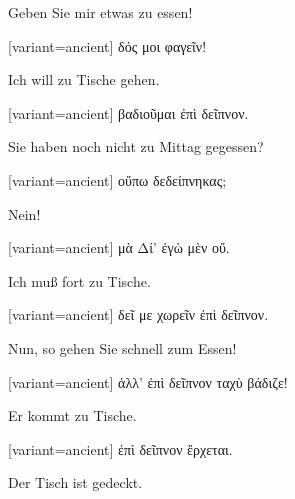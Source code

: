 Geben Sie mir etwas zu essen!

\switchcolumn

\begin{greek}[variant=ancient]%
δός μοι φαγεῖν!

\end{greek}%
\switchcolumn*

Ich will zu Tische gehen.

\switchcolumn

\begin{greek}[variant=ancient]%
βαδιοῦμαι ἐπὶ δεῖπνον.

\end{greek}%
\switchcolumn*

Sie haben noch nicht zu Mittag gegessen?

\switchcolumn

\begin{greek}[variant=ancient]%
οὔπω δεδείπνηκας;

\end{greek}%
\switchcolumn*

Nein!

\switchcolumn

\begin{greek}[variant=ancient]%
μὰ Δί' ἐγὼ μὲν οὔ.

\end{greek}%
\switchcolumn*

Ich muß fort zu Tische.

\switchcolumn

\begin{greek}[variant=ancient]%
δεῖ με χωρεῖν ἐπὶ δεῖπνον.

\end{greek}%
\switchcolumn*

Nun, so gehen Sie schnell zum Essen!

\switchcolumn

\begin{greek}[variant=ancient]%
ἀλλ' ἐπὶ δεῖπνον ταχὺ βάδιζε!

\end{greek}%
\switchcolumn*

Er kommt zu Tische.

\switchcolumn

\begin{greek}[variant=ancient]%
ἐπὶ δεῖπνον ἔρχεται.

\end{greek}%
\switchcolumn*

Der Tisch ist gedeckt.

